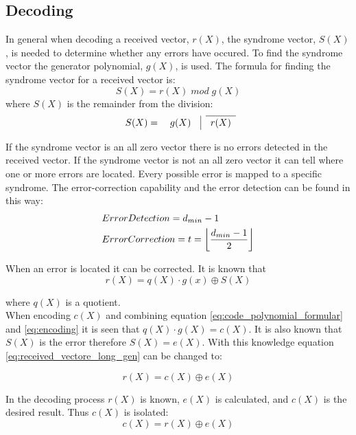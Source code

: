 \documentclass[Main]{subfiles}
\begin{document}
\subsection{Decoding}
In general when decoding a received vector, $ r(X) $, the syndrome vector, $ S(X) $, is needed to determine whether any errors have occured.
To find the syndrome vector the generator polynomial, $ g(X) $, is used.
The formula for finding the syndrome vector for a received vector is:
\begin{equation}
S(X) = r(X) \; mod \; g(X)
\label{syndrom formular}
\end{equation}
where $ S(X) $ is the remainder from the division: 
\[
\renewcommand\arraystretch{1.2}
\begin{array}{cccccccccccccccccc}
\cline{2-2}
 S(X) = \quad g(X) \quad \vline & r(X) \\
\end{array}
\]

If the syndrome vector is an all zero vector there is no errors detected in the received vector.
If the syndrome vector is not an all zero vector it can tell where one or more errors are located.
Every possible error is mapped to a specific syndrome.
The error-correction capability and the error detection can be found in this way:
\begin{align}
& Error Detection = d_{min}-1\\
& ErrorCorrection = t = \floor*{\frac{d_{min}-1}{2}}
\end{align}

When an error is located it can be corrected.
It is known that
\begin{equation}
\label{eq:received_vectore_long_gen}
r(X) = q(X) \cdot g(x) \oplus S(X)
\end{equation}

where $q(X)$ is a quotient.
\\

When encoding $c(X)$ and combining equation \ref{eq:code_polynomial_formular} and \ref{eq:encoding} it is seen that $q(X) \cdot g(X) = c(X)$.
It is also known that $ S(X) $ is the error therefore $S(X) = e(X)$.
With this knowledge equation \ref{eq:received_vectore_long_gen} can be changed to:

\begin{equation}
r(X) = c(X) \oplus e(X)
\end{equation}

In the decoding process $ r(X) $ is known, $ e(X) $ is calculated, and $ c(X) $ is the desired result.
Thus $ c(X) $ is isolated:
\begin{equation}
c(X) = r(X) \oplus e(X)
\end{equation}
\end{document}
